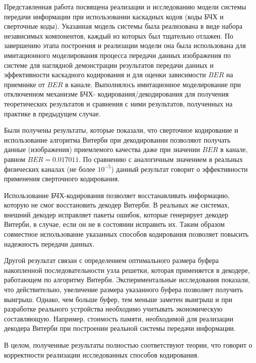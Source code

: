 \Conclusion %
Представленная работа посвящена реализации и исследованию модели системы передачи информации при использовании каскадных кодов (коды 
БЧХ и сверточные коды). Указанная модель системы была реализована в виде набора независимых компонентов, каждый из которых был 
тщательно отлажен. По завершению этапа построения и реализации модели она была использована для имитационного моделирования процесса 
передачи данных изображения по системе для наглядной демонстрации результатов передачи данных и эффективности каскадного кодирования и 
для оценки зависимости $BER$ на приемнике от $BER$ в канале. Выполнялось имитационное моделирование при отключенном механизме БЧХ-
кодирования/декодирования для получения теоретических результатов и сравнения с ними результатов, полученных на практике в предыдущем 
случае.

Были получены результаты, которые показали, что сверточное кодирование и использование алгоритма Витерби при декодировании позволяют 
получать данные (изображения) приемлемого качества даже при значении $BER$ в канале, равном $BER=0.017011$. По сравнению с аналогичным 
значением в реальных физических каналах (не более $10^{-5}$) данный результат говорит о эффективности применения сверточного 
кодирования.

Использование БЧХ-кодирования позволяет восстанавливать информацию, которую не смог восстановить декодер Витерби. В реальных же 
системах, внешний декодер исправляет пакеты ошибок, которые генерирует декодер Витерби, в случае, если он не в состоянии исправить их. 
Таким образом совместное использование указанных способов кодирования позволяет повысить надежность передачи данных.

Другой результат связан с определением оптимального размера буфера накопленной последовательности узла решетки, которая применяется в 
декодере, работающем по алгоритму Витерби. Экспериментальные исследования показали, что действительно, увеличение размера указанного 
буфера позволяет получить выигрыш. Однако, чем больше буфер, тем меньше заметен выигрыш и при разработке реального устройства 
необходимо учитывать экономическую составляющую. Например, стоимость памяти, необходимой для реализации декодера Витерби при 
построении реальной системы передачи информации.

В целом, полученные результаты полностью соответствуют теории, что говорит о корректности реализации исследованных способов кодирования.

